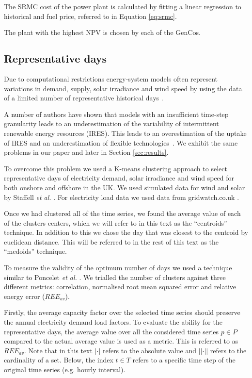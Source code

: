 \documentclass[final,3p,times,twocolumn,numbers]{elsarticle}
\begin{document}
The SRMC cost of the power plant is calculated by fitting a linear regression to historical  and fuel price, referred to in Equation \ref{eq:srmc}. 

The plant with the highest NPV is chosen by each of the GenCos.
 
 
\subsection{Representative days}

Due to computational restrictions energy-system models often represent variations in demand, supply, solar irradiance and wind speed by using the data of a limited number of representative historical days \cite{Poncelet2017}.

A number of authors have shown that models with an insufficient time-step granularity leads to an underestimation of the variability of intermittent renewable energy resources (IRES). This leads to an overestimation of the uptake of IRES and an underestimation of flexible technologies~\cite{Ludig2011,Haydt2011}. We exhibit the same problems in our paper \cite{Kell} and later in Section \ref{sec:results}.

To overcome this problem we used a K-means clustering approach to select representative days of electricity demand, solar irradiance and wind speed for both onshore and offshore in the UK. We used simulated data for wind and solar by Staffell \textit{et al.} \cite{Staffell2016}. For electricity load data we used data from gridwatch.co.uk \cite{gridwatch}.

Once we had clustered all of the time series, we found the average value of each of the clusters centers, which we will refer to in this text as the ``centroids'' technique. In addition to this we chose the day that was closest to the centroid by euclidean distance. This will be referred to in the rest of this text as the ``medoids'' technique.

To measure the validity of the optimum number of days we used a technique similar to Poncelet \textit{et al.} \cite{Dhaeseleer2015, Poncelet2017}. We trialled the number of clusters against three different metrics: correlation, normalised root mean squared error and relative energy error ($REE_{av}$). 



Firstly, the average capacity factor over the selected time series should preserve the annual electricity demand load factors. To evaluate the ability for the representative days, the average value over all the considered time series $p\in P$ compared to the actual average value is used as a metric. This is referred to as $REE_{av}$. Note that in this text $\left|\cdot\right|$ refers to the absolute value and $\left|\left|\cdot\right|\right|$ refers to the cardinality of a set. Below, the index $t\in T$ refers to a specific time step of the original time series (e.g. hourly interval).
\end{document}
